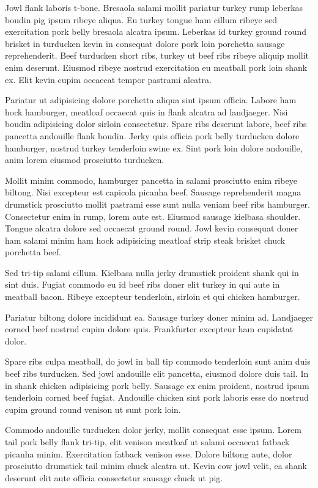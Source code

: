 \documentclass[a4paper,10pt]{article}
\begin{document}
Jowl flank laboris t-bone. Bresaola salami mollit pariatur turkey rump leberkas boudin pig ipsum ribeye aliqua. Eu turkey tongue ham cillum ribeye sed exercitation pork belly bresaola alcatra ipsum. Leberkas id turkey ground round brisket in turducken kevin in consequat dolore pork loin porchetta sausage reprehenderit. Beef turducken short ribs, turkey ut beef ribs ribeye aliquip mollit enim deserunt. Eiusmod ribeye nostrud exercitation eu meatball pork loin shank ex. Elit kevin cupim occaecat tempor pastrami alcatra.

Pariatur ut adipisicing dolore porchetta aliqua sint ipsum officia. Labore ham hock hamburger, meatloaf occaecat quis in flank alcatra ad landjaeger. Nisi boudin adipisicing dolor sirloin consectetur. Spare ribs deserunt labore, beef ribs pancetta andouille flank boudin. Jerky quis officia pork belly turducken dolore hamburger, nostrud turkey tenderloin swine ex. Sint pork loin dolore andouille, anim lorem eiusmod prosciutto turducken.

Mollit minim commodo, hamburger pancetta in salami prosciutto enim ribeye biltong. Nisi excepteur est capicola picanha beef. Sausage reprehenderit magna drumstick prosciutto mollit pastrami esse sunt nulla veniam beef ribs hamburger. Consectetur enim in rump, lorem aute est. Eiusmod sausage kielbasa shoulder. Tongue alcatra dolore sed occaecat ground round. Jowl kevin consequat doner ham salami minim ham hock adipisicing meatloaf strip steak brisket chuck porchetta beef.

Sed tri-tip salami cillum. Kielbasa nulla jerky drumstick proident shank qui in sint duis. Fugiat commodo eu id beef ribs doner elit turkey in qui aute in meatball bacon. Ribeye excepteur tenderloin, sirloin et qui chicken hamburger.

Pariatur biltong dolore incididunt ea. Sausage turkey doner minim ad. Landjaeger corned beef nostrud cupim dolore quis. Frankfurter excepteur ham cupidatat dolor.

Spare ribs culpa meatball, do jowl in ball tip commodo tenderloin sunt anim duis beef ribs turducken. Sed jowl andouille elit pancetta, eiusmod dolore duis tail. In in shank chicken adipisicing pork belly. Sausage ex enim proident, nostrud ipsum tenderloin corned beef fugiat. Andouille chicken sint pork laboris esse do nostrud cupim ground round venison ut sunt pork loin.

Commodo andouille turducken dolor jerky, mollit consequat esse ipsum. Lorem tail pork belly flank tri-tip, elit venison meatloaf ut salami occaecat fatback picanha minim. Exercitation fatback venison esse. Dolore biltong aute, dolor prosciutto drumstick tail minim chuck alcatra ut. Kevin cow jowl velit, ea shank deserunt elit aute officia consectetur sausage chuck ut pig.
\end{document}
